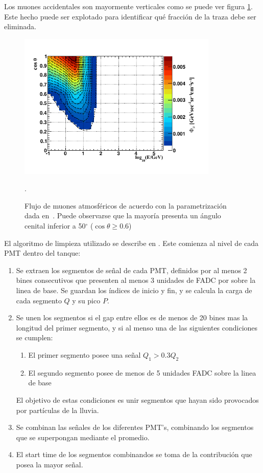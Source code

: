 		Los muones accidentales son mayormente verticales como se puede ver figura \ref{fig:atmo_mu_flux}.
		Este hecho puede ser explotado para identificar qué fracción de la traza debe ser eliminada.
		\begin{figure}[ht]
		\begin{center}
		\includegraphics[width=0.85\textwidth]{fig/seleccionAuger/atmo_mu_flux.pdf}
		\caption{Flujo de muones atmosféricos de acuerdo con la parametrización dada en~\cite{cite:atmo_mu}. Puede observarse que la mayoría presenta un ángulo cenital inferior a 50$^{\circ}$ ($\cos\theta \geqslant 0.6$)}.
		\label{fig:atmo_mu_flux}
		\end{center}
		\end{figure}
		
		El algoritmo de limpieza utilizado se describe en \cite{trace_cleaning}.
		Este comienza al nivel de cada PMT dentro del tanque:
		\begin{enumerate}
		 \item Se extraen los segmentos de señal de cada PMT, definidos por al menos 2 bines consecutivos que presenten al menos 3 unidades de FADC por sobre la linea de base.
		 Se guardan los índices de inicio y fin, y se calcula la carga de cada segmento $Q$ y su pico $P$.
		 \item Se unen los segmentos si el gap entre ellos es de menos de 20 bines mas la longitud del primer segmento, y si al menso una de las siguientes condiciones se cumplen:
		 \begin{enumerate}
		  \item El primer segmento posee una señal $Q_1>0.3Q_2$
		  \item El segundo segmento posee de menos de 5 unidades FADC sobre la linea de base
		 \end{enumerate}
		El objetivo de estas condiciones es unir segmentos que hayan sido provocados por partículas de la lluvia.
		\item Se combinan las señales de los diferentes PMT's, combinando los segmentos que se superpongan mediante el promedio.
		\item El start time de los segmentos combinandos se toma de la contribución que posea la mayor señal.
		\end{enumerate}
		
